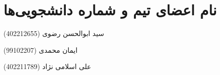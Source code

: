 \section*{نام اعضای تیم و شماره دانشجویی‌ها}

سید ابوالحسن رضوی (402212655)

ایمان محمدی (99102207)

علی اسلامی نژاد (402211789)
